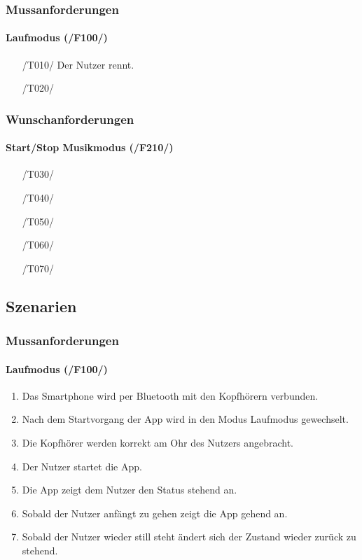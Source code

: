 \documentclass[a4paper,12pt]{article}
\begin{document}
    \subsubsection{Mussanforderungen}
    \paragraph{Laufmodus (/F100/)}
    \begin{enumerate}
      \item[/T010/] Der Nutzer rennt.
      \item[/T020/]
    \end{enumerate}

    \subsubsection{Wunschanforderungen}
      \paragraph{Start/Stop Musikmodus (/F210/)}
      \begin{itemize}
        \item[/T030/] 
        \item[/T040/] 
        \item[/T050/] 
        \item[/T060/] 
        \item[/T070/] 
      \end{itemize}
      

  \subsection{Szenarien}
    \subsubsection{Mussanforderungen}
      \paragraph{Laufmodus (/F100/)}
      \begin{enumerate}
        \item Das Smartphone wird per Bluetooth mit den Kopfhörern verbunden.
        \item Nach dem Startvorgang der App wird in den Modus \glqq Laufmodus\grqq{} gewechselt. %
        \item Die Kopfhörer werden korrekt am Ohr des Nutzers angebracht. %
        \item Der Nutzer startet die App.
        \item Die App zeigt dem Nutzer den Status \glqq stehend\grqq{} an.
        \item Sobald der Nutzer anfängt zu gehen zeigt die App \glqq gehend\grqq{} an.
        \item Sobald der Nutzer wieder still steht ändert sich der Zustand wieder zurück zu \glqq stehend\grqq. 
      \end{enumerate}
\end{document}
